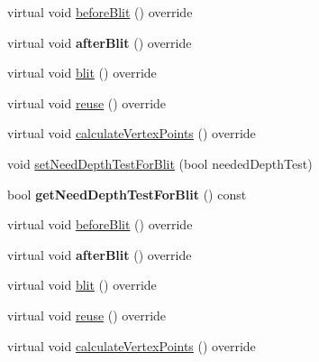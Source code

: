 \textbf{ }\par
\begin{DoxyCompactItemize}
\item 
virtual void \hyperlink{classGrid3D_a6f8b9946289014c187e645dd6de7974c}{before\+Blit} () override
\item 
\mbox{\label{classGrid3D_a959fa69e3c79f98ab8f62cf8058fb025}} 
virtual void {\bfseries after\+Blit} () override
\item 
virtual void \hyperlink{classGrid3D_afbf54ef1bb003967ed93ec5c238716f0}{blit} () override
\item 
virtual void \hyperlink{classGrid3D_ad6c4e2574b5a4104b7bde30bc083ffb7}{reuse} () override
\item 
virtual void \hyperlink{classGrid3D_a6b2a8e963e37df0c9deddb34f7c3a1ae}{calculate\+Vertex\+Points} () override
\end{DoxyCompactItemize}

\textbf{ }\par
\begin{DoxyCompactItemize}
\item 
void \hyperlink{classGrid3D_a6d2d00afb35013a206d85b5cd298f781}{set\+Need\+Depth\+Test\+For\+Blit} (bool needed\+Depth\+Test)
\item 
\mbox{\label{classGrid3D_a61c1776c49df54cc275acb01f925fdce}} 
bool {\bfseries get\+Need\+Depth\+Test\+For\+Blit} () const
\end{DoxyCompactItemize}

\textbf{ }\par
\begin{DoxyCompactItemize}
\item 
virtual void \hyperlink{classGrid3D_a11850dd96447d34ae98b4d606177eee3}{before\+Blit} () override
\item 
\mbox{\label{classGrid3D_afd5a554d0f8524ffba0e5f9245a90870}} 
virtual void {\bfseries after\+Blit} () override
\item 
virtual void \hyperlink{classGrid3D_af09d4f416ea51976f1ab19688716b3b2}{blit} () override
\item 
virtual void \hyperlink{classGrid3D_a0a191279a3bb479d5d85a58c78685865}{reuse} () override
\item 
virtual void \hyperlink{classGrid3D_a062df8e14b99c36b71ff391b57de22fe}{calculate\+Vertex\+Points} () override
\end{DoxyCompactItemize}

